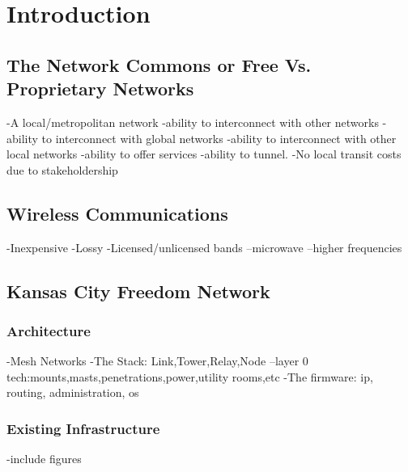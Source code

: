 \section{Introduction}\label{Introduction}
\subsection{The Network Commons or Free Vs. Proprietary Networks}
-A local/metropolitan network
-ability to interconnect with other networks
-ability to interconnect with global networks
-ability to interconnect with other local networks
-ability to offer services
-ability to tunnel.
-No local transit costs due to stakeholdership

\subsection{Wireless Communications}
-Inexpensive
-Lossy
-Licensed/unlicensed bands
--microwave
--higher frequencies


\subsection{Kansas City Freedom Network}\label{KCFN}
\subsubsection{Architecture}
-Mesh Networks
-The Stack: Link,Tower,Relay,Node
--layer 0 tech:mounts,masts,penetrations,power,utility rooms,etc
-The firmware: ip, routing, administration, os

\subsubsection{Existing Infrastructure}
-include figures

